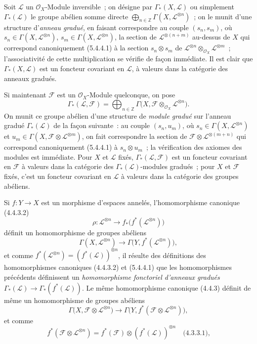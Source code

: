 \begin{env}[5.4.6]
\label{0.5.4.6-fr}
Soit $\mathcal{L}$ un $\mathcal{O}_X$-Module inversible~; on désigne par
$\Gamma_*(X,\mathcal{L})$ ou simplement $\Gamma_*(\mathcal{L})$ le groupe
abélien somme directe
$\bigoplus_{n\in\mathbb{Z}}\Gamma(X,\mathcal{L}^{\otimes n})$~; on le munit
d'une structure d'\emph{anneau gradué}, en faisant correspondre au couple
$(s_n,s_m)$, où $s_n\in\Gamma(X,\mathcal{L}^{\otimes n})$,
$s_m\in\Gamma(X,\mathcal{L}^{\otimes n})$, la section de
$\mathcal{L}^{\otimes(n+m)}$ au-dessus de $X$ qui correspond canoniquement
(5.4.4.1) à la section $s_n\otimes s_m$ de
$\mathcal{L}^{\otimes n}\otimes_{\mathcal{O}_X}\mathcal{L}^{\otimes m}$~;
l'associativité de cette multiplication se vérifie de façon immédiate. Il est
clair que $\Gamma_*(X,\mathcal{L})$ est un foncteur covariant en
$\mathcal{L}$, à valeurs dans la catégorie des anneaux gradués.

Si maintenant $\mathcal{F}$ est un $\mathcal{O}_X$-Module quelconque, on pose
\[
  \Gamma_*(\mathcal{L},\mathcal{F})
  =\bigoplus_{n\in\mathbb{Z}}
   \Gamma\bigl(X,
     \mathcal{F}\otimes_{\mathcal{O}_X}\mathcal{L}^{\otimes n}\bigr).
\]
On munit ce groupe abélien d'une structure de \emph{module gradué} sur
l'anneau gradué $\Gamma_*(\mathcal{L})$ de la façon suivante~: au couple
$(s_n,u_m)$, où $s_n\in\Gamma(X,\mathcal{L}^{\otimes n})$ et
$u_m\in\Gamma(X,
\mathcal{F}\otimes\mathcal{L}^{\otimes m})$, on fait
correspondre la section de
$\mathcal{F}\otimes\mathcal{L}^{\otimes(m+n)}$ qui correspond
canoniquement (5.4.4.1) à $s_n\otimes u_m$~; la vérification des axiomes des
modules est immédiate. Pour $X$ et $\mathcal{L}$ fixés,
$\Gamma_*(\mathcal{L},\mathcal{F})$ est un foncteur covariant en
$\mathcal{F}$ à valeurs dans la catégorie des
$\Gamma_*(\mathcal{L})$-modules gradués~; pour $X$ et $\mathcal{F}$ fixés,
c'est un foncteur covariant en $\mathcal{L}$ à valeurs dans la catégorie des
groupes abéliens.

Si $f:Y\to X$ est un morphisme d'espaces annelés, l'homomorphisme canonique
(4.4.3.2)
\[
  \rho:\mathcal{L}^{\otimes n}
  \longrightarrow
  f_*\bigl(f^*(\mathcal{L}^{\otimes n})\bigr)
\]
définit un homomorphisme de groupes abéliens
\[
  \Gamma(X,\mathcal{L}^{\otimes n})
  \longrightarrow
  \Gamma\bigl(Y,f^*(\mathcal{L}^{\otimes n})\bigr),
\]
et comme
$f^*(\mathcal{L}^{\otimes n})=(f^*(\mathcal{L}))^{\otimes n}$, il résulte des
définitions des homomorphismes canoniques (4.4.3.2) et (5.4.4.1) que les
homomorphismes précédents définissent un \emph{homomorphisme fonctoriel
d'anneaux gradués}
$\Gamma_*(\mathcal{L})\to\Gamma_*(f^*(\mathcal{L}))$. Le même homomorphisme
canonique (4.4.3) définit de même un homomorphisme de groupes abéliens
\[
  \Gamma\bigl(X,
    \mathcal{F}\otimes\mathcal{L}^{\otimes n}\bigr)
  \longrightarrow
  \Gamma\bigl(Y,
    f^*(\mathcal{F}\otimes\mathcal{L}^{\otimes n})\bigr),
\]
et comme
\[
  f^*(\mathcal{F}\otimes\mathcal{L}^{\otimes n})
  =f^*(\mathcal{F})\otimes
   (f^*(\mathcal{L}))^{\otimes n}
  \quad\text{(4.3.3.1),}
\]


\end{env}
